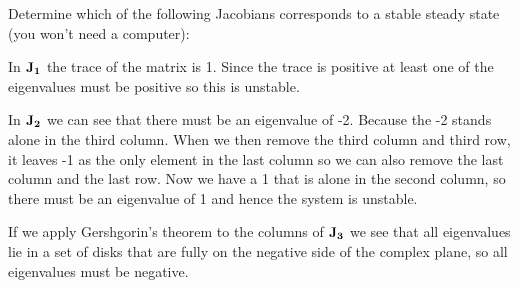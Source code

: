 Determine which of the following Jacobians corresponds to a stable steady state (you won't need a computer):

\solution 
In $\bf J_1$ the trace of the matrix is 1. Since the trace is positive at least one of the eigenvalues must be positive so this is unstable.

In $\bf J_2$ we can see that there must be an eigenvalue of -2. Because the -2 stands alone in the third column. When we then remove the third column and third row, it leaves -1 as the only element in the last column so we can also remove the last column and the last row. Now we have a 1 that is alone in the second column, so there must be an eigenvalue of 1 and hence the system is unstable. 

If we apply Gershgorin's theorem to the columns of $\bf J_3$ we see that all eigenvalues lie in a set of disks that are fully on the negative side of the complex plane, so all eigenvalues must be negative. 

